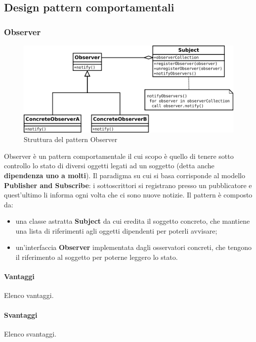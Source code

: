 \documentclass[../SpecificaTecnica.tex]{subfiles}
\begin{document}
	\subsection{Design pattern comportamentali}
		\subsubsection{Observer}
			\begin{figure}[!h]
				\centering
				\includegraphics[scale=0.7]{pattern/observer}
				\caption{Struttura del pattern Observer}
				\label{fig:Struttura_Observer}
			\end{figure}
			Observer è un pattern comportamentale il cui scopo è quello di tenere sotto controllo lo stato di diversi oggetti legati ad un soggetto (detta anche \textbf{dipendenza uno a molti}). Il paradigma su cui si basa corrisponde al modello \textbf{Publisher and Subscribe}: i sottoscrittori si registrano presso un pubblicatore e quest'ultimo li informa ogni volta che ci sono nuove notizie. Il pattern è composto da:
				\begin{itemize}
					\item una classe astratta \textbf{Subject} da cui eredita il soggetto concreto, che mantiene una lista di riferimenti agli oggetti dipendenti per poterli avvisare;
					\item un'interfaccia \textbf{Observer} implementata dagli osservatori concreti, che tengono il riferimento al soggetto per poterne leggero lo stato.
				\end{itemize}
			\paragraph{Vantaggi}
				Elenco vantaggi.
			\paragraph{Svantaggi}
				Elenco svantaggi.
\end{document}
